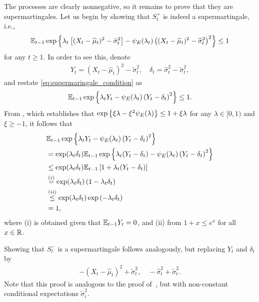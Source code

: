 The processes are clearly nonnegative, so it remains to prove that they are supermartingales. Let us begin by showing that $S_t^+$ is indeed a supermartingale, i.e.,
\begin{align} \label{eq:supermaringale_condition}
    \mathbb{E}_{t-1} \exp \left\{ \lambda_t \left[ (X_t - \widehat\mu_t)^2 - \tilde\sigma_t^2  \right] - \psi_E(\lambda_t) \left( (X_t - \widehat\mu_t)^2 - \widehat \sigma_t^2 \right)^2 \right\} \leq 1
\end{align}
for any $t \geq 1$. In order to see this, denote
\begin{align*}
    Y_t = (X_t - \widehat\mu_t)^2 - \tilde\sigma_t^2, \quad \delta_t = \widehat \sigma_t^2 - \tilde\sigma_t^2,
\end{align*}
and restate \eqref{eq:supermaringale_condition} as
\begin{align} \label{eq:supermaringale_condition_simplified}
    \mathbb{E}_{t-1} \exp \left\{ \lambda_t Y_t - \psi_E(\lambda_t) \left( Y_t - \delta_t \right)^2 \right\} \leq 1.
\end{align}
From \citet[Proposition 4.1]{fan_exponential_2015}, which establishes that $\exp \left\{ \xi\lambda - \xi^2 \psi_E(\lambda)\right\} \leq 1 + \xi \lambda$ for any $\lambda \in [0, 1)$ and $\xi \geq -1$, it follows that
\begin{align*}
    &\mathbb{E}_{t-1} \exp \left\{ \lambda_t Y_t - \psi_E(\lambda_t) \left( Y_t - \delta_t \right)^2 \right\}
    \\& =\exp (\lambda_t \delta_t)\mathbb{E}_{t-1} \exp \left\{ \lambda_t (Y_t - \delta_t) - \psi_E(\lambda_t) \left( Y_t -  \delta_t \right)^2 \right\} 
    \\ &\leq  \exp (\lambda_t \delta_t) \mathbb{E}_{t-1} \left[ 1 + \lambda_t (Y_t - \delta_t)\right]
    \\ &\stackrel{(i)}{=}  \exp (\lambda_t \delta_t)  \left( 1 - \lambda_t \delta_t\right)
    \\ &\stackrel{(ii)}{\leq}  \exp (\lambda_t \delta_t) \exp\left( - \lambda_t \delta_t \right)
    \\&= 1,
\end{align*}
where (i) is obtained given that $\mathbb{E}_{t-1} Y_t = 0$, and (ii) from $1+x \leq e^x$ for all $x\in\mathbb{R}$. 

Showing that $S_t^-$ is a supermartingale follows analogously, but replacing $Y_t$ and $\delta_t$ by
\begin{align*}
      -(X_t - \widehat\mu_t)^2 + \tilde\sigma_t^2, \quad  -\widehat \sigma_t^2 + \tilde\sigma_t^2.
\end{align*}
Note that this proof is analogous to the proof of~\citet[Theorem 2]{waudby2024estimating}, but with non-constant conditional expectations $\tilde\sigma_i^2$.





